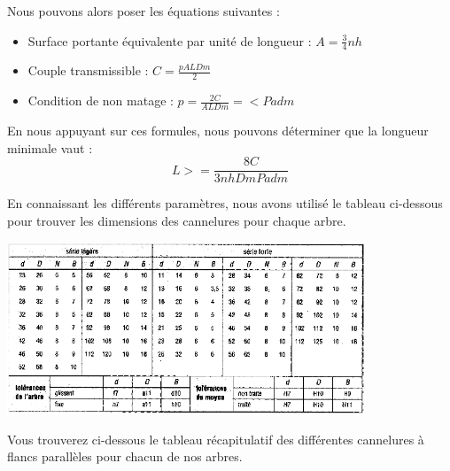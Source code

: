 \documentclass{config}
\begin{document}
\begin{spacing}{1.2}
Nous pouvons alors poser les équations suivantes :

\begin{itemize}
    \item Surface portante équivalente par unité de longueur : $A = \frac{3}{4} n h$
    \item Couple transmissible : $C = \frac{p A L Dm}{2}$
    \item Condition de non matage : $p=  \frac{2 C}{A L Dm}=<  Padm$
\end{itemize} 

En nous appuyant sur ces formules, nous pouvons déterminer que la longueur minimale vaut :
\[L >= \frac{8 C}{3 n h Dm Padm}\]

En connaissant les différents paramètres, nous avons utilisé le tableau ci-dessous pour trouver les dimensions des cannelures pour chaque arbre.

\begin{center}
\includegraphics[width=0.8\textwidth]{tab_cannelures.PNG}
\end{center}
    
    
Vous trouverez ci-dessous le tableau récapitulatif des différentes cannelures à flancs parallèles pour chacun de nos arbres.

\begin{table}[h]
\centering
{}
\end{table}


\end{spacing}
\end{document}
